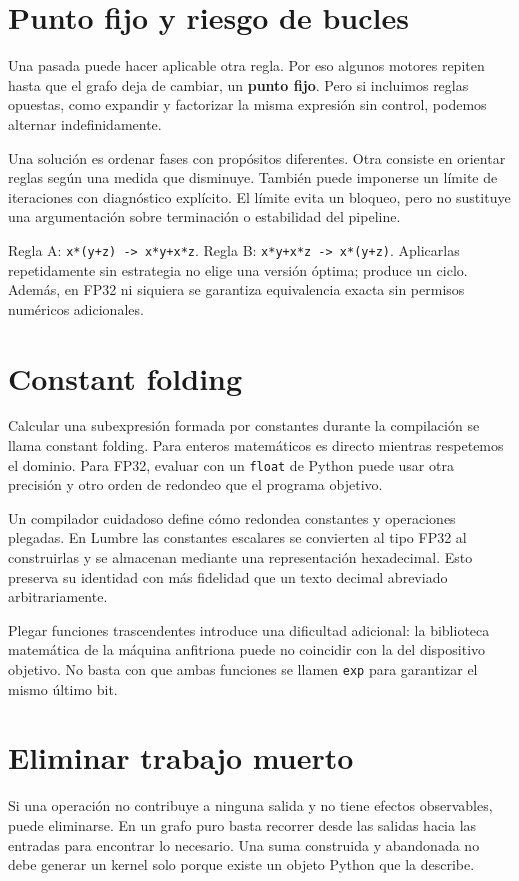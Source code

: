 \documentclass[12pt,a4paper,oneside]{report}
\begin{document}
\section{Punto fijo y riesgo de bucles}
Una pasada puede hacer aplicable otra regla. Por eso algunos motores repiten hasta que el grafo deja de cambiar, un \textbf{punto fijo}. Pero si incluimos reglas opuestas, como expandir y factorizar la misma expresión sin control, podemos alternar indefinidamente.

Una solución es ordenar fases con propósitos diferentes. Otra consiste en orientar reglas según una medida que disminuye. También puede imponerse un límite de iteraciones con diagnóstico explícito. El límite evita un bloqueo, pero no sustituye una argumentación sobre terminación o estabilidad del pipeline.

\begin{ejemplo}
Regla A: \texttt{x*(y+z) -> x*y+x*z}. Regla B: \texttt{x*y+x*z -> x*(y+z)}. Aplicarlas repetidamente sin estrategia no elige una versión óptima; produce un ciclo. Además, en FP32 ni siquiera se garantiza equivalencia exacta sin permisos numéricos adicionales.

\end{ejemplo}
\section{Constant folding}
Calcular una subexpresión formada por constantes durante la compilación se llama constant folding. Para enteros matemáticos es directo mientras respetemos el dominio. Para FP32, evaluar con un \texttt{float} de Python puede usar otra precisión y otro orden de redondeo que el programa objetivo.

Un compilador cuidadoso define cómo redondea constantes y operaciones plegadas. En Lumbre las constantes escalares se convierten al tipo FP32 al construirlas y se almacenan mediante una representación hexadecimal. Esto preserva su identidad con más fidelidad que un texto decimal abreviado arbitrariamente.

Plegar funciones trascendentes introduce una dificultad adicional: la biblioteca matemática de la máquina anfitriona puede no coincidir con la del dispositivo objetivo. No basta con que ambas funciones se llamen \texttt{exp} para garantizar el mismo último bit.

\section{Eliminar trabajo muerto}
Si una operación no contribuye a ninguna salida y no tiene efectos observables, puede eliminarse. En un grafo puro basta recorrer desde las salidas hacia las entradas para encontrar lo necesario. Una suma construida y abandonada no debe generar un kernel solo porque existe un objeto Python que la describe.
\end{document}
